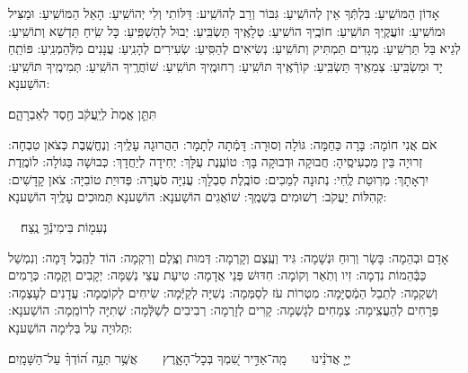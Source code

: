 \documentclass[twoside, openany, parskip=half, 11pt]{book}
\begin{document}

אָדוֹן הַמּוֹשִֽׁיעַ: בִּלְתְּֿךָ אֵין לְהוֹשִֽׁיעַ: גִּבּוֹר וְרַב לְהוֹשִֽׁיע: דַּלּוֹתִי וְלִי יְהוֹשִֽׁיעַ: הָאֵל הַמּוֹשִֽׁיעַ: וּמַצִּיל וּמוֹשִֽׁיעַ: זוֹעֲקֶֽיךָ תּוֹשִֽׁיעַ: חוֹכֶֽיךָ הוֹשִֽׁיעַ: טְלָאֶֽיךָ תַּשְׂבִּֽיעַ: יְבוּל לְהַשְׁפִּֽיעַ: כָּל שִֽׂיחַ תַּדְשֵׁא וְתוֹשִֽׁיעַ: לְגֵיא בַּל תַּרְשִֽׁיעַ: מְגָדִים תַּמְתִּיק וְתוֹשִֽׁיעַ: נְשִׂיאִים לְהַסִּֽיעַ: שְׂעִירִים לְהָנִֽיעַ: עֲנָנִים מִלְּֿהַמְנִֽיעַ: פּוֹתֵֽחַ יָד וּמַשְׂבִּֽיעַ: צְמֵאֶֽיךָ תַּשְׂבִּֽיעַ: קוֹרְֿאֶֽיךָ תּוֹשִֽׁיעַ: רְחוּמֶֽיךָ תּוֹשִֽׁיעַ:
שׁוֹחֲרֶֽיךָ הוֹשִֽׁיעַ: 
תְּמִימֶֽיךָ תּוֹשִֽׁיעַ: הוֹשַׁענָא:

 תִּתֵּ֤ן אֱמֶת֙ לְיַֽעֲקֹ֔ב חֶ֖סֶד לְאַבְרָהָ֑ם׃


אֹם אֲנִי חוֹמָה: בָּרָה כַּחַמָּה: גּוֹלָה וְסוּרָה: דָּמְֿתָה לְתָמָר: הַהֲרוּגָה עָלֶֽיךָ: וְנֶחֱשֶֽׁבֶת כְּצֹאן טִבְחָה: זְרוּיָה בֵּין מַכְעִיסֶֽיהָ: חֲבוּקָה וּדְבוּקָה בָּךְ: טוֹעֶֽנֶת עֻלָּךְ: יְחִידָה לְיַחֲדָךְ: כְּבוּשָׁה בַּגּוֹלָה: לוֹמֶֽדֶת יִרְאָתָךְ: מְרֽוּטַת לֶֽחִי: נְתוּנָה לְמַכִים: סוֹבֶֽלֶת סִבְלָךְ: עֲנִיָּה סֹעֲרָה: פְּדוּיַת טוֹבִיָּה: צֹאן קָדָשִׁים: קְהִלּוֹת יַעֲקֹב: רְשׁוּמִים בִּשְׁמֶֽךָ: שׁוֹאֲגִים הוֹשַׁענָא: הוֹשַׁענָא תְּמוּכִים עָלֶֽיךָ הוֹשַׁענָא:

 נְעִמ֖וֹת בִּימִינְֿךָ֣ נֶֽצַח׃


אָדָם וּבְהֵמָה: בָּשָׂר וְרֽוּחַ וּנְשָׁמָה: גִּיד וְעֶֽצֶם וְקָרְמָה: דְּמוּת וְצֶֽלֶם וְרִקְמָה: הוֹד לַהֶֽבֶל דָּמָה: וְנִמְשַׁל כַּבְּֿהֵמוֹת נִדְמָה: זִיו וְתֹֽאַר וְקוֹמָה: חִדּוּשׁ פְּנֵי אֲדָמָה: טִיעַת עֲצֵי נְשַׁמָּה: יְקָבִים וְקָמָה: כְּרָמִים וְשִׁקְמָה: לְתֵבֵל הַמְֿסֻיָּמָה: מִטְרוֹת עֹז לְסַמְּמָה: נְשִׁיָּה לְקַיְּֿמָה: שִׂיחִים לְקוֹמֲמָה: עֲדָנִים לְעָצְמָה: פְּרָחִים לְהַעֲצִֽימָה: צְמָחִים לְגָשְׁמָה: קָרִים לְזָרְמָה: רְבִיבִים לְשַׁלְּֿמָה:
שְׁתִיָּה לְרוֹמֵֽמָה: הוֹשַׁענָא:
תְּלוּיָה עַל בְּלִימָה הוֹשַׁענָא:

 יְיָ֤ אֲדֹנֵ֗ינוּ  מָֽה־אַדִּ֣יר שִׁ֭מְךָ בְּכָל־הָאָ֑רֶץ  אֲשֶׁ֥ר תְּנָ֥ה ה֝וֹדְךָ֗ עַל־הַשָּׁמָֽיִם׃
\end{document}
